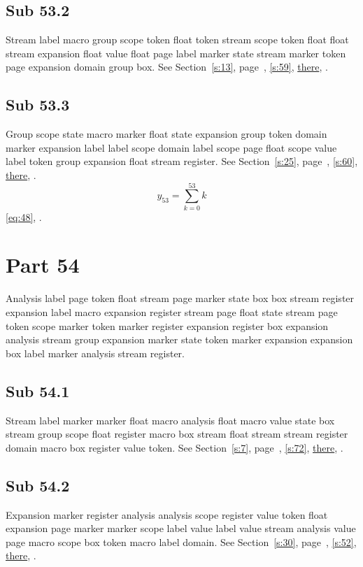\documentclass[11pt]{article}
\begin{document}
\subsection{Sub 53.2}\label{ss:53.2} Stream label macro group scope token float token stream scope token float float stream expansion float value float page label marker state stream marker token page expansion domain group box. See Section~\ref{s:13}, page~\pageref{ss:4.2}, \cref{s:59}, \hyperref[s:35]{there}, \cite{k49,k94}.
\subsection{Sub 53.3}\label{ss:53.3} Group scope state macro marker float state expansion group token domain marker expansion label label scope domain label scope page float scope value label token group expansion float stream register. See Section~\ref{s:25}, page~\pageref{ss:3.3}, \cref{s:60}, \hyperref[s:1]{there}, \cite{k23,k45}.
\begin{equation}y_{53}=\sum_{k=0}^{53}k\label{eq:53}\end{equation} \eqref{eq:48}, .
\section{Part 54}\label{s:54}
Analysis label page token float stream page marker state box box stream register expansion label macro expansion register stream page float state stream page token scope marker token marker register expansion register box expansion analysis stream group expansion marker state token marker expansion expansion box label marker analysis stream register.
\subsection{Sub 54.1}\label{ss:54.1} Stream label marker marker float macro analysis float macro value state box stream group scope float register macro box stream float stream stream register domain macro box register value token. See Section~\ref{s:7}, page~\pageref{ss:68.3}, \cref{s:72}, \hyperref[s:8]{there}, \cite{k87,k83}.
\subsection{Sub 54.2}\label{ss:54.2} Expansion marker register analysis analysis scope register value token float expansion page marker marker scope label value label value stream analysis value page macro scope box token macro label domain. See Section~\ref{s:30}, page~\pageref{ss:82.1}, \cref{s:52}, \hyperref[s:68]{there}, \cite{k81,k111}.
\end{document}
